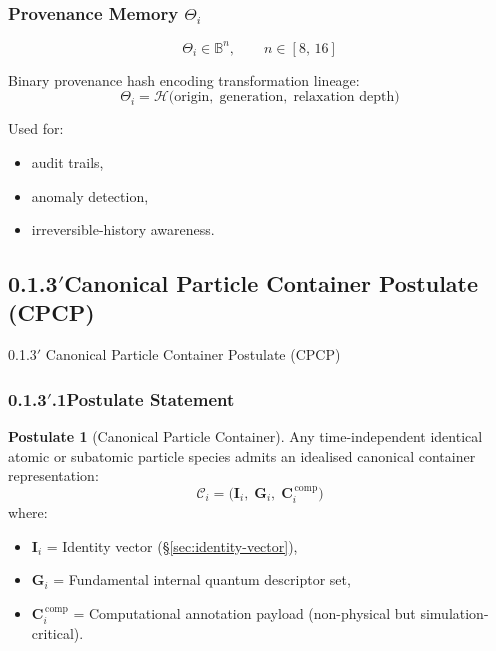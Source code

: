 \documentclass[11pt, a4paper, oneside]{article}
\theoremstyle{definition}
\newtheorem{postulate}{Postulate}[section]
\theoremstyle{remark}
\newcommand{\Bset}{\mathbb{B}}
\newcommand{\boldI}{\mathbf{I}}
\newcommand{\boldG}{\mathbf{G}}
\newcommand{\boldC}{\mathbf{C}}
\begin{document}
\subsubsection{Provenance Memory
              \texorpdfstring{$\Theta_i$}{Theta-i}}
\label{sec:provenance-memory}

\[
  \Theta_i \in \Bset^{n}, \qquad n \in [8,\,16]
\]

Binary provenance hash encoding transformation lineage:
%
\begin{equation}
  \Theta_i = \mathcal{H}\!\bigl(
    \text{origin},\;
    \text{generation},\;
    \text{relaxation depth}
  \bigr)
  \label{eq:provenance-hash}
\end{equation}

Used for:
\begin{itemize}
  \item audit trails,
  \item anomaly detection,
  \item irreversible-history awareness.
\end{itemize}



\bigskip
\subsection*{0.1.3$'$\quad Canonical Particle Container Postulate (CPCP)}
%
  {0.1.3$'$ Canonical Particle Container Postulate (CPCP)}
\label{sec:cpcp}

\subsubsection*{0.1.3$'$.1\quad Postulate Statement}
\label{sec:cpcp-postulate}

\begin{postulate}[Canonical Particle Container]
Any time-independent identical atomic or subatomic particle species
admits an idealised canonical container representation:
%
\begin{equation}
  \mathcal{C}_i =
  \bigl(
    \boldI_i,\;
    \boldG_i,\;
    \boldC_i^{\,\mathrm{comp}}
  \bigr)
  \label{eq:container}
\end{equation}
%
where:
\begin{itemize}
  \item $\boldI_i$ = Identity vector (§\ref{sec:identity-vector}),
  \item $\boldG_i$ = Fundamental internal quantum descriptor set,
  \item $\boldC_i^{\,\mathrm{comp}}$ = Computational annotation payload
        (non-physical but simulation-critical).
\end{itemize}
\end{postulate}
\end{document}
